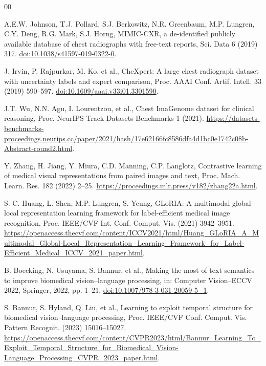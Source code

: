 \documentclass[preprint,12pt]{elsarticle}
\begin{document}
\begin{thebibliography}{00}

A.E.W. Johnson, T.J. Pollard, S.J. Berkowitz, N.R. Greenbaum,
M.P. Lungren, C.Y. Deng, R.G. Mark, S.J. Horng,
MIMIC-CXR, a de-identified publicly available database of chest radiographs
with free-text reports,
Sci. Data 6 (2019) 317.
\href{https://doi.org/10.1038/s41597-019-0322-0}{doi:10.1038/s41597-019-0322-0}.

J. Irvin, P. Rajpurkar, M. Ko, et al.,
CheXpert: A large chest radiograph dataset with uncertainty labels and expert
comparison,
Proc. AAAI Conf. Artif. Intell. 33 (2019) 590--597.
\href{https://doi.org/10.1609/aaai.v33i01.3301590}{doi:10.1609/aaai.v33i01.3301590}.

J.T. Wu, N.N. Agu, I. Lourentzou, et al.,
Chest ImaGenome dataset for clinical reasoning,
Proc. NeurIPS Track Datasets Benchmarks 1 (2021).
\url{https://datasets-benchmarks-proceedings.neurips.cc/paper/2021/hash/17e62166fc8586dfa4d1bc0e1742c08b-Abstract-round2.html}.

Y. Zhang, H. Jiang, Y. Miura, C.D. Manning, C.P. Langlotz,
Contrastive learning of medical visual representations from paired images and
text,
Proc. Mach. Learn. Res. 182 (2022) 2--25.
\url{https://proceedings.mlr.press/v182/zhang22a.html}.

S.-C. Huang, L. Shen, M.P. Lungren, S. Yeung,
GLoRIA: A multimodal global-local representation learning framework for
label-efficient medical image recognition,
Proc. IEEE/CVF Int. Conf. Comput. Vis. (2021) 3942--3951.
\url{https://openaccess.thecvf.com/content/ICCV2021/html/Huang_GLoRIA_A_Multimodal_Global-Local_Representation_Learning_Framework_for_Label-Efficient_Medical_ICCV_2021_paper.html}.

B. Boecking, N. Usuyama, S. Bannur, et al.,
Making the most of text semantics to improve biomedical vision--language
processing,
in: Computer Vision--ECCV 2022, Springer, 2022, pp. 1--21.
\href{https://doi.org/10.1007/978-3-031-20059-5_1}{doi:10.1007/978-3-031-20059-5\_1}.

S. Bannur, S. Hyland, Q. Liu, et al.,
Learning to exploit temporal structure for biomedical vision--language
processing,
Proc. IEEE/CVF Conf. Comput. Vis. Pattern Recognit. (2023) 15016--15027.
\url{https://openaccess.thecvf.com/content/CVPR2023/html/Bannur_Learning_To_Exploit_Temporal_Structure_for_Biomedical_Vision-Language_Processing_CVPR_2023_paper.html}.


\end{thebibliography}
\end{document}
